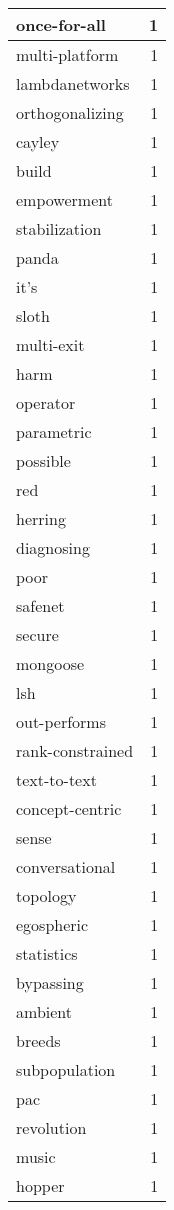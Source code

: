 \begin{table}[h]
\begin{tabular}{|l|r|}
\hline
once-for-all & 1 \\
\hline
multi-platform & 1 \\
\hline
lambdanetworks & 1 \\
\hline
orthogonalizing & 1 \\
\hline
cayley & 1 \\
\hline
build & 1 \\
\hline
empowerment & 1 \\
\hline
stabilization & 1 \\
\hline
panda & 1 \\
\hline
it's & 1 \\
\hline
sloth & 1 \\
\hline
multi-exit & 1 \\
\hline
harm & 1 \\
\hline
operator & 1 \\
\hline
parametric & 1 \\
\hline
possible & 1 \\
\hline
red & 1 \\
\hline
herring & 1 \\
\hline
diagnosing & 1 \\
\hline
poor & 1 \\
\hline
safenet & 1 \\
\hline
secure & 1 \\
\hline
mongoose & 1 \\
\hline
lsh & 1 \\
\hline
out-performs & 1 \\
\hline
rank-constrained & 1 \\
\hline
text-to-text & 1 \\
\hline
concept-centric & 1 \\
\hline
sense & 1 \\
\hline
conversational & 1 \\
\hline
topology & 1 \\
\hline
egospheric & 1 \\
\hline
statistics & 1 \\
\hline
bypassing & 1 \\
\hline
ambient & 1 \\
\hline
breeds & 1 \\
\hline
subpopulation & 1 \\
\hline
pac & 1 \\
\hline
revolution & 1 \\
\hline
music & 1 \\
\hline
hopper & 1 \\

\end{tabular}
\end{table}
